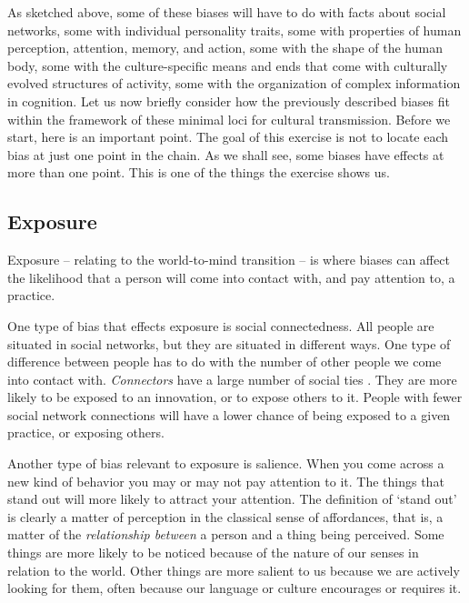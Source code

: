 As sketched above, some of these biases will have to do with facts about 
social networks, some with individual personality traits, some with 
properties of human perception, attention, memory, and action, some with 
the shape of the human body, some with the culture-specific means and 
ends that come with culturally evolved structures of activity, some with 
the organization of complex information in cognition. Let us now briefly 
consider how the previously described biases fit within 
the framework of these minimal loci for cultural transmission. Before we start, here is an important point. The goal of this exercise is not to locate each bias at just one point in the chain. As we shall see, some biases have effects at more than one point. This is one of the things the exercise shows us.


\subsection{Exposure}
Exposure -- relating to the world-to-mind transition -- is where 
biases can affect the likelihood that a person will come into contact 
with, and pay attention to, a practice.



One type of bias that effects exposure is social connectedness. All people are situated in social networks, 
but they are situated in different ways. One type of difference between 
people has to do with the number of other people we come into contact with. 
\textit{Connectors} have a large number of social ties \citep{granovetter_strength_1973}. They are more likely to be exposed to an 
innovation, or to expose others to it. People with fewer social network connections will have a 
lower chance of being exposed to a given practice, or exposing others. 



Another type of bias relevant to exposure is salience.  When you come across a new kind of behavior you may or may not pay attention to it. The things that stand out will more likely to attract your attention. The definition of `stand out' is 
clearly a matter of perception in the classical sense of affordances, 
that is, a matter of the \textit{relationship between} a person and a thing being perceived. 
Some things are more likely to be noticed because of the nature of our 
senses in relation to the world. Other things are more 
salient to us because we are actively looking for them, often because our 
language or culture encourages or requires it.



